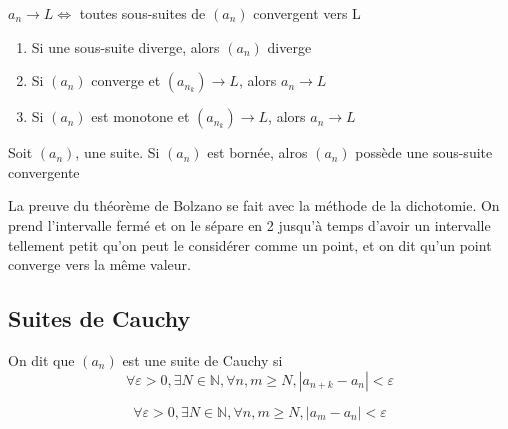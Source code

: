 \documentclass{article}
\begin{document}
\begin{theorem}
    $a_n \rightarrow L \Longleftrightarrow$ toutes sous-suites de $(a_n)$
    convergent vers L
\end{theorem}

\begin{corollary}
    \begin{enumerate}
	\item Si une sous-suite diverge, alors $(a_n)$ diverge
	\item Si $(a_n)$ converge et $(a_{n_k}) \rightarrow L$, alors $a_n
	    \rightarrow L$
	\item Si $(a_n)$ est monotone et $(a_{n_k}) \rightarrow L$, alors $a_n
	    \rightarrow L$
    \end{enumerate}
\end{corollary}

\begin{theorem}
    Soit $(a_n)$, une suite. Si $(a_n)$ est bornée, alros $(a_n)$ possède
    une sous-suite convergente
\end{theorem}

\begin{remark}
    La preuve du théorème de Bolzano se fait avec la méthode de la dichotomie.
    On prend l'intervalle fermé et on le sépare en 2 jusqu'à temps d'avoir un
    intervalle tellement petit qu'on peut le considérer comme un point, et
    on dit qu'un point converge vers la même valeur.
\end{remark}

\subsection{Suites de Cauchy}

\begin{definition}
    On dit que $(a_n)$ est une suite de Cauchy si
    $$ \forall \varepsilon > 0, \exists N \in \mathbb{N}, \forall n,m \geq N,
    |a_{n+k} - a_n| < \varepsilon$$
\end{definition}

\begin{remark}
    $$ \forall \varepsilon > 0, \exists N \in \mathbb{N}, \forall n,m \geq N,
    |a_m - a_n| < \varepsilon$$
\end{remark}
\end{document}
